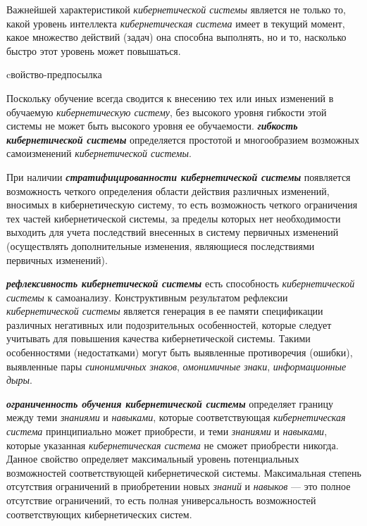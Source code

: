 Важнейшей характеристикой \textit{кибернетической системы} является не только то, какой уровень интеллекта \textit{кибернетическая система} имеет в текущий момент, какое множество действий (задач) она способна выполнять, но и то, насколько быстро этот уровень может повышаться.

\begin{SCn}
\begin{scnrelfromlist}{cвойство-предпосылка}
\end{scnrelfromlist}
\end{SCn}

Поскольку обучение всегда сводится к внесению тех или иных изменений в обучаемую \textit{кибернетическую систему}, без высокого уровня гибкости этой системы не может быть высокого уровня ее обучаемости.
\textbf{\textit{гибкость кибернетической системы}} определяется простотой и многообразием возможных самоизменений \textit{кибернетической системы}.

При наличии \textbf{\textit{стратифицированности кибернетической системы}} появляется возможность четкого определения области действия различных изменений, вносимых в кибернетическую систему, то есть возможность четкого ограничения тех частей кибернетической системы, за пределы которых нет необходимости выходить для учета последствий внесенных в систему первичных изменений (осуществлять дополнительные изменения, являющиеся последствиями первичных изменений).

\textbf{\textit{рефлексивность кибернетической системы}} есть способность \textit{кибернетической системы} к самоанализу.
Конструктивным результатом рефлексии \textit{кибернетической системы} является генерация в ее памяти спецификации различных негативных или подозрительных особенностей, которые следует учитывать для повышения качества кибернетической системы. Такими особенностями (недостатками) могут быть выявленные противоречия (ошибки), выявленные пары \textit{синонимичных знаков}, \textit{омонимичные знаки}, \textit{информационные дыры}.

\textbf{\textit{ограниченность обучения кибернетической системы}} определяет границу между теми \textit{знаниями} и \textit{навыками}, которые соответствующая \textit{кибернетическая система} принципиально может приобрести, и теми \textit{знаниями} и \textit{навыками}, которые указанная \textit{кибернетическая система} не сможет приобрести никогда. Данное свойство определяет максимальный уровень потенциальных возможностей соответствующей кибернетической системы. Максимальная степень отсутствия ограничений в приобретении новых \textit{знаний} и \textit{навыков} --- это полное отсутствие ограничений, то есть полная универсальность возможностей соответствующих кибернетических систем.

